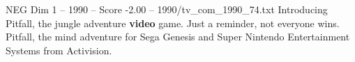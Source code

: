\begin{textsample}{NEG Dim 1 – 1990 – Score -2.00 – 1990/tv\_com\_1990\_74.txt}  \label{ex:f1_neg_041}
Introducing Pitfall, the jungle adventure \textbf{video} game.
Just a reminder, not everyone wins.
Pitfall, the mind adventure for Sega Genesis and Super Nintendo Entertainment Systems from Activision.

\end{textsample}

